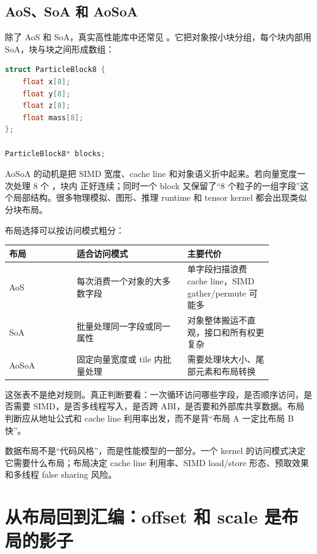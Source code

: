 \subsection{AoS、SoA 和 AoSoA}

除了 AoS 和 SoA，真实高性能库中还常见 。它把对象按小块分组，每个块内部用 SoA，块与块之间形成数组：

\begin{lstlisting}[language=C++]
struct ParticleBlock8 {
    float x[8];
    float y[8];
    float z[8];
    float mass[8];
};

ParticleBlock8* blocks;
\end{lstlisting}

AoSoA 的动机是把 SIMD 宽度、cache line 和对象语义折中起来。若向量宽度一次处理 8 个 ，块内  正好连续；同时一个 block 又保留了“8 个粒子的一组字段”这个局部结构。很多物理模拟、图形、推理 runtime 和 tensor kernel 都会出现类似分块布局。

布局选择可以按访问模式粗分：

\begin{center}
\begin{tabular}{p{0.22\linewidth}p{0.36\linewidth}p{0.28\linewidth}}
\toprule
布局 & 适合访问模式 & 主要代价 \\
\midrule
AoS & 每次消费一个对象的大多数字段 & 单字段扫描浪费 cache line，SIMD gather/permute 可能多 \\
SoA & 批量处理同一字段或同一属性 & 对象整体搬运不直观，接口和所有权更复杂 \\
AoSoA & 固定向量宽度或 tile 内批量处理 & 需要处理块大小、尾部元素和布局转换 \\
\bottomrule
\end{tabular}
\end{center}

这张表不是绝对规则。真正判断要看：一次循环访问哪些字段，是否顺序访问，是否需要 SIMD，是否多线程写入，是否跨 ABI，是否要和外部库共享数据。布局判断应从地址公式和 cache line 利用率出发，而不是背“布局 A 一定比布局 B 快”。

\begin{keyidea}
数据布局不是“代码风格”，而是性能模型的一部分。一个 kernel 的访问模式决定它需要什么布局；布局决定 cache line 利用率、SIMD load/store 形态、预取效果和多线程 false sharing 风险。
\end{keyidea}

\section{从布局回到汇编：offset 和 scale 是布局的影子}

